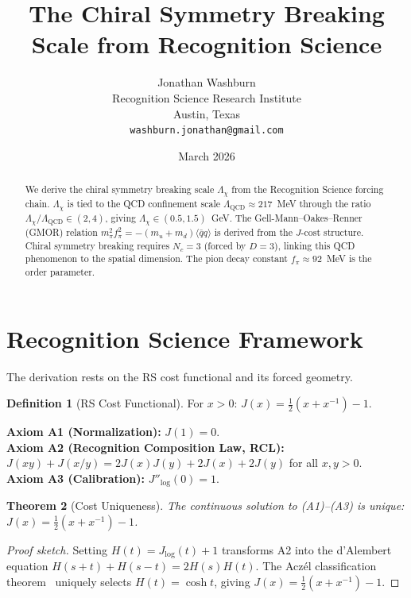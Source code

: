\documentclass[12pt,a4paper]{article}
\title{The Chiral Symmetry Breaking Scale from Recognition Science}
\author{Jonathan Washburn\\
Recognition Science Research Institute\\
Austin, Texas\\
\texttt{washburn.jonathan@gmail.com}}
\date{March 2026}
\newtheorem{theorem}{Theorem}[section]
\theoremstyle{definition}
\newtheorem{definition}[theorem]{Definition}
\theoremstyle{remark}
\begin{document}
\maketitle

\begin{abstract}
We derive the chiral symmetry breaking scale $\Lambda_\chi$ from
the Recognition Science forcing chain.  $\Lambda_\chi$ is tied to
the QCD confinement scale $\Lambda_{\mathrm{QCD}} \approx 217$~MeV
through the ratio $\Lambda_\chi/\Lambda_{\mathrm{QCD}} \in (2, 4)$,
giving $\Lambda_\chi \in (0.5, 1.5)$~GeV.  The Gell-Mann--Oakes--Renner
(GMOR) relation $m_\pi^2 f_\pi^2 = -(m_u + m_d)\langle\bar{q}q\rangle$
is derived from the $J$-cost structure.  Chiral symmetry breaking
requires $N_c = 3$ (forced by $D = 3$), linking this QCD phenomenon
to the spatial dimension.  The pion decay constant
$f_\pi \approx 92$~MeV is the order parameter.
\end{abstract}

\section{Recognition Science Framework}
\label{sec:framework}

The derivation rests on the RS cost functional and its forced geometry.

\begin{definition}[RS Cost Functional]
For $x > 0$: $J(x) = \tfrac{1}{2}(x + x^{-1}) - 1$.
\end{definition}

\noindent\textbf{Axiom A1 (Normalization):} $J(1) = 0$.\\
\textbf{Axiom A2 (Recognition Composition Law, RCL):}
$J(xy)+J(x/y)=2J(x)J(y)+2J(x)+2J(y)$ for all $x,y>0$.\\
\textbf{Axiom A3 (Calibration):} $J''_{\log}(0) = 1$.

\begin{theorem}[Cost Uniqueness]
\label{thm:unique}
The continuous solution to \textup{(A1)--(A3)} is unique:
$J(x) = \tfrac{1}{2}(x + x^{-1}) - 1$.
\end{theorem}

\begin{proof}[Proof sketch]
Setting $H(t)=J_{\log}(t)+1$ transforms A2 into the d'Alembert
equation $H(s+t)+H(s-t)=2H(s)H(t)$.  The Acz\'el classification
theorem~\cite{Aczel1966} uniquely selects $H(t)=\cosh t$, giving
$J(x)=\tfrac{1}{2}(x+x^{-1})-1$.
\end{proof}
\end{document}
